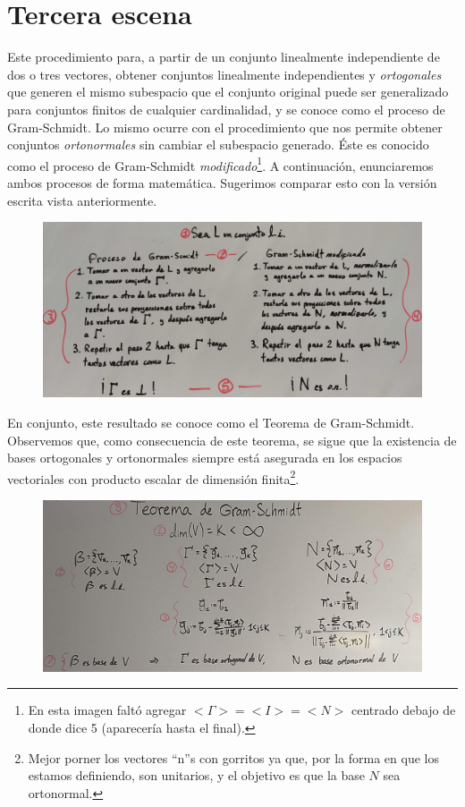 \documentclass[12pt,dvipsnames]{article}
\numberwithin{equation}{section}
\begin{document}

\newpage
\section{Tercera escena}

Este procedimiento para, a partir de un conjunto linealmente independiente de dos o tres vectores, obtener conjuntos linealmente independientes y \emph{ortogonales} que generen el mismo subespacio que el conjunto original puede ser generalizado para conjuntos finitos de cualquier cardinalidad, y se conoce como el proceso de Gram-Schmidt. Lo mismo ocurre con el procedimiento que nos permite obtener conjuntos \emph{ortonormales} sin cambiar el subespacio generado. Éste es conocido como el proceso de Gram-Schmidt \emph{modificado}\footnote{En esta imagen faltó agregar $<\Gamma>=<I>=<N>$ centrado debajo de donde dice 5 (aparecería hasta el final).}. A continuación, enunciaremos ambos procesos de forma matemática. Sugerimos comparar esto con la versión escrita vista anteriormente. 

\begin{figure}[h!]
    \centering
    \includegraphics[width=16cm]{3-1.png}
\end{figure}

En conjunto, este resultado se conoce como el Teorema de Gram-Schmidt. Observemos que, como consecuencia de este teorema, se sigue que la existencia de bases ortogonales y ortonormales siempre está asegurada en los espacios vectoriales con producto escalar de dimensión finita\footnote{Mejor porner los vectores ``n''s con gorritos ya que, por la forma en que los estamos definiendo, son unitarios, y el objetivo es que la base $N$ sea ortonormal.}.

\begin{figure}[h!]
    \centering
    \includegraphics[width=16cm]{3-2.png}
\end{figure}
\end{document}
